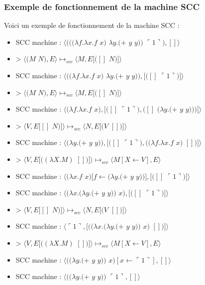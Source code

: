 \documentclass[10pt,a4paper]{article}
\begin{document}
				\subsubsection{Exemple de fonctionnement de la machine SCC}\label{SCC}
				
					Voici un exemple de fonctionnement de la machine SCC :
					
					\begin{itemize}
						\item[] SCC machine : $\langle(((\lambda f.\lambda x.f$ $x)$ $\lambda y.(+$ $y$ $y))$ $\ulcorner 1\urcorner),[]\rangle$
						\item[] > $\langle(M$ $N),E\rangle \longmapsto_{scc} \langle M,E[([]$ $N)]\rangle$
						\item[] SCC machine : $\langle((\lambda f.\lambda x.f$ $x)$ $\lambda y.(+$ $y$ $y)),[([]$ $\ulcorner 1\urcorner)]\rangle$
						\item[] > $\langle(M$ $N),E\rangle \longmapsto_{scc} \langle M,E[([]$ $N)]\rangle$
						\item[] SCC machine : $\langle(\lambda f.\lambda x.f$ $x),[([]$ $\ulcorner 1\urcorner),([]$ $(\lambda y.(+$ $y$ $y)))]\rangle$
						\item[] >  $\langle V,E[[]$ $N)]\rangle \longmapsto_{scc} \langle N,E[(V$ $[])]\rangle$
						\item[] SCC machine : $\langle(\lambda y.(+$ $y$ $y)),[([]$ $\ulcorner 1\urcorner),((\lambda f.\lambda x.f$ $x)$ $[])]\rangle$
						\item[] > $\langle V,E[((\lambda X.M)$ $[])]\rangle \longmapsto_{scc} \langle M[X\leftarrow V],E\rangle$
						\item[] SCC machine : $\langle(\lambda x.f$ $x)[f\leftarrow(\lambda y.(+$ $y$ $y))],[([]$ $\ulcorner 1\urcorner)]\rangle$
						\item[] SCC machine : $\langle(\lambda x.(\lambda y.(+$ $y$ $y))$ $x),[([]$ $\ulcorner 1\urcorner)]\rangle$
						\item[] >  $\langle V,E[[]$ $N)]\rangle \longmapsto_{scc} \langle N,E[(V$ $[])]\rangle$
						\item[] SCC machine : $\langle\ulcorner 1\urcorner,[((\lambda x.(\lambda y.(+$ $y$ $y))$ $x)$ $[])]\rangle$
						\item[] > $\langle V,E[((\lambda X.M)$ $[])]\rangle \longmapsto_{scc} \langle M[X\leftarrow V],E\rangle$
						\item[] SCC machine : $\langle((\lambda y.(+$ $y$ $y))$ $x)[x \leftarrow\ulcorner 1\urcorner],[]\rangle$
						\item[] SCC machine : $\langle((\lambda y.(+$ $y$ $y))$ $\ulcorner 1\urcorner,[]\rangle$

\end{itemize}
\end{document}
